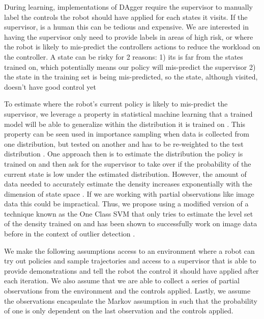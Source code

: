 \documentclass[10pt, conference]{ieeeconf}      %
\begin{document}
During learning, implementations of DAgger require the supervisor to manually label the controls the robot should have applied for each states it visits. If the supervisor, is a human this can be tedious and expensive. We are interested in having the supervisor only need to provide labels in areas of high risk, or where the robot is likely to mis-predict the controllers actions to reduce the workload on the controller.  A state can be risky for 2 reasons: 1) its is far from the states trained on, which potentially means our policy will mis-predict the supervisor \cite{tokdar2010importance} 2)  the state in the training set is being mis-predicted, so the state, although visited, doesn't have good control yet 

To estimate where the robot's current policy is likely to mis-predict the supervisor, we  leverage a property in statistical machine learning that a trained model will be able to generalize within the distribution it is trained on \cite{tokdar2010importance}. This property can be seen used in importance sampling when data is collected from one distribution, but tested on another and has to be re-weighted to the test distribution \cite{huang2006correcting}. One approach then is to estimate the distribution the policy is trained on and then ask for the supervisor to take over if the  probability of the current state is low under the estimated distribution. However, the amount of data needed to accurately estimate the density increases exponentially with the dimension of state space \cite{nadaraya1964estimating}. If we are working with partial observations like image data this could be impractical.  Thus, we propose using a modified version of a technique known as the One Class SVM that only tries to estimate the level set of the density trained on \cite{scholkopf2001estimating} and has been shown to successfully work on image data before in the context of outlier detection \cite{liu2014unsupervised}. 

We make the following assumptions access to an environment where a robot can try out policies and sample trajectories and access to a supervisor that is able to provide demonstrations and tell the robot the control it should have applied after each iteration. We also assume that we are able to collect a series of partial observations from the environment and the controls applied. Lastly, we assume the observations encapsulate the Markov assumption in such that the probability of one is only dependent on the last observation and the controls applied. 
\end{document}
